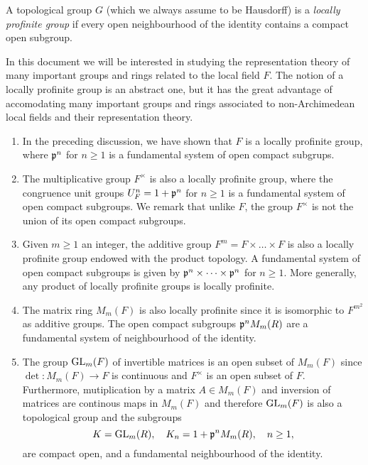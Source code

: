 \begin{defn}\label{loc_prof_grp}
    A topological group $G$ (which we always assume to be Hausdorff) is a \textit{locally profinite group} if every open neighbourhood of the identity contains a compact open subgroup. 
\end{defn}

In this document we will be interested in studying the representation theory of many important groups and rings related to the local field $F$. The notion of a locally profinite group is an abstract one, but it has the great advantage of accomodating many important groups and rings associated to non-Archimedean local fields and their representation theory.

\begin{examples}

    \begin{enumerate}
        \item In the preceding discussion, we have shown that $F$ is a locally profinite group, where $\mathfrak{p}^n$ for $n\geq1$ is a fundamental system of open compact subgrups.
        \item The multiplicative group $F^{\times}$ is also a locally profinite group, where the congruence unit groups $U_F^n=1+\mathfrak{p}^n$ for $n\geq1$ is a fundamental system of open compact subgroups. We remark that unlike $F$, the group $F^{\times}$ is not the union of its open compact subgroups.
        \item Given $m\geq1$ an integer, the additive group $F^m=F\times\dots\times F$ is also a locally profinite group endowed with the product topology. A fundamental system of open compact subgroups is given by $\mathfrak{p}^{n}\times\dots\times\mathfrak{p}^{n}$ for $n\geq1$. More generally, any product of locally profinite groups is locally profinite.
        \item The matrix ring $M_m(F)$ is also locally profinite since it is isomorphic to $F^{m^2}$ as additive groups. The open compact subgroups $\mathfrak{p}^n M_m(R)$ are a fundamental system of neighbourhood of the identity.
        \item The group $\mathrm{GL}_m(F)$ of invertible matrices is an open subset of $M_m(F)$ since $\det:M_m(F)\rightarrow F$ is continuous and $F^{\times}$ is an open subset of $F$. Furthermore, mutiplication by a matrix $A\in M_m(F)$ and inversion of matrices are continous maps in $M_m(F)$ and therefore $\mathrm{GL}_m(F)$ is also a topological group and the subgroups
        $$K=\mathrm{GL}_m(R),\quad K_n=1+\mathfrak{p}^nM_m(R),\quad n\geq 1,$$
        are compact open, and a fundamental neighbourhood of the identity.
    \end{enumerate}
\end{examples}

